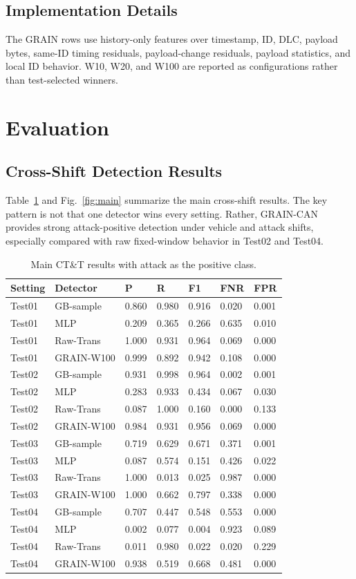 \documentclass[runningheads]{llncs}
\begin{document}
\subsection{Implementation Details}
The GRAIN rows use history-only features over timestamp, ID, DLC, payload bytes, same-ID timing residuals, payload-change residuals, payload statistics, and local ID behavior. W10, W20, and W100 are reported as configurations rather than test-selected winners.

\section{Evaluation}
\subsection{Cross-Shift Detection Results}
Table~\ref{tab:main} and Fig.~\ref{fig:main} summarize the main cross-shift results. The key pattern is not that one detector wins every setting. Rather, GRAIN-CAN provides strong attack-positive detection under vehicle and attack shifts, especially compared with raw fixed-window behavior in Test02 and Test04.
\begin{table}[H]
\caption{Main CT\&T results with attack as the positive class.}\label{tab:main}
\centering\small
\begin{tabular}{lllllll}
\hline
Setting & Detector & P & R & F1 & FNR & FPR \\
\hline
Test01 & GB-sample & 0.860 & 0.980 & 0.916 & 0.020 & 0.001 \\
Test01 & MLP & 0.209 & 0.365 & 0.266 & 0.635 & 0.010 \\
Test01 & Raw-Trans & 1.000 & 0.931 & 0.964 & 0.069 & 0.000 \\
Test01 & GRAIN-W100 & 0.999 & 0.892 & 0.942 & 0.108 & 0.000 \\
Test02 & GB-sample & 0.931 & 0.998 & 0.964 & 0.002 & 0.001 \\
Test02 & MLP & 0.283 & 0.933 & 0.434 & 0.067 & 0.030 \\
Test02 & Raw-Trans & 0.087 & 1.000 & 0.160 & 0.000 & 0.133 \\
Test02 & GRAIN-W100 & 0.984 & 0.931 & 0.956 & 0.069 & 0.000 \\
Test03 & GB-sample & 0.719 & 0.629 & 0.671 & 0.371 & 0.001 \\
Test03 & MLP & 0.087 & 0.574 & 0.151 & 0.426 & 0.022 \\
Test03 & Raw-Trans & 1.000 & 0.013 & 0.025 & 0.987 & 0.000 \\
Test03 & GRAIN-W100 & 1.000 & 0.662 & 0.797 & 0.338 & 0.000 \\
Test04 & GB-sample & 0.707 & 0.447 & 0.548 & 0.553 & 0.000 \\
Test04 & MLP & 0.002 & 0.077 & 0.004 & 0.923 & 0.089 \\
Test04 & Raw-Trans & 0.011 & 0.980 & 0.022 & 0.020 & 0.229 \\
Test04 & GRAIN-W100 & 0.938 & 0.519 & 0.668 & 0.481 & 0.000 \\
\hline
\end{tabular}
\end{table}
\end{document}
